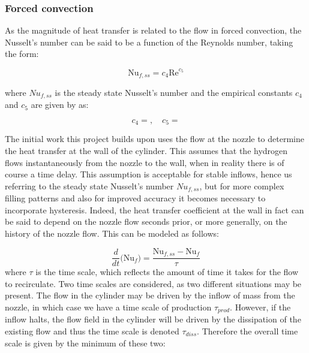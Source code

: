 \subsubsection{Forced convection}
\label{sec:forcedConvection}
As the magnitude of heat transfer is related to the flow in forced convection, the Nusselt's number can be said to be a function of the Reynolds number, taking the form:

\begin{equation}
\label{equ:nusseltReynolds}
\text{Nu}_{f,ss} = c_4 \text{Re} ^{c_5}
\end{equation}

\noindent where ${Nu}_{f,ss}$ is the steady state Nusselt's number and the empirical constants $c_4$ and $c_5$ are given by  as:

\begin{equation}
\label{equ:nusseltReynoldsConsts}
c_4 =   ,  \quad c_5 = 
\end{equation}

The initial work this project builds upon uses the flow at the nozzle to determine the heat transfer at the wall of the cylinder. This assumes that the hydrogen flows instantaneously from the nozzle to the wall, when in reality there is of course a time delay. This assumption is acceptable for stable inflows, hence us referring to the steady state Nusselt's number ${Nu}_{f,ss}$,  but for more complex filling patterns and also for improved accuracy it becomes necessary to incorporate hysteresis. Indeed, the heat transfer coefficient at the wall in fact can be said to depend on the nozzle flow seconds prior, or more generally, on the history of the nozzle flow. This can be modeled as follows:  

\begin{equation}
\frac{d}{dt}\Big(\text{Nu}_f \Big) = \frac{\text{Nu}_{f,ss}-\text{Nu}_f}{\tau}
\end{equation}
where $\tau$ is the time scale, which reflects the amount of time it takes for the flow to recirculate. Two time scales are considered, as two different situations may be present. The flow in the cylinder may be driven by the inflow of mass from the nozzle, in which case we have a time scale of production $\tau_{prod}$. However, if the inflow halts, the flow field in the cylinder will be driven by the dissipation of the existing flow and thus the time scale is denoted $\tau_{diss}$. Therefore the overall time scale is given by the minimum of these two: 

